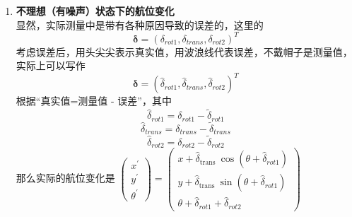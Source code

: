 \documentclass[../main.tex]{subfiles}
\begin{document}
\begin{enumerate}
\begin{enumerate}
        \item \textbf{不理想（有噪声）状态下的航位变化}\\
        显然，实际测量中是带有各种原因导致的误差的，这里的$$\boldsymbol{\delta} = (\delta_{rot1}, \delta_{trans}, \delta_{rot2})^T$$
        考虑误差后，用头尖尖表示真实值，用波浪线代表误差，不戴帽子是测量值，实际上可以写作
        $$\boldsymbol{\delta} = ({\widehat{\delta }}_{rot1},{\widehat{\delta }}_{trans}, {\widehat{\delta }}_{rot2})^T$$
        根据“真实值=测量值 - 误差”，其中
        $${\widehat{\delta }}_{rot1} = {\delta }_{rot1} - {\widetilde{\delta }}_{rot1}$$
        $${\widehat{\delta }}_{trans} = {\delta }_{trans} - {\widetilde{\delta }}_{trans}$$
        $${\widehat{\delta }}_{rot2} = {\delta }_{rot2} - {\widetilde{\delta }}_{rot2} $$
        那么实际的航位变化是
        \( \left( \begin{array}{l} {x}^{\prime } \\  {y}^{\prime } \\  {\theta }^{\prime } \end{array}\right)  = \left( \begin{matrix} x + {\widehat{\delta }}_{\text{trans }}\cos \left( {\theta  + {\widehat{\delta }}_{rot1}}\right) \\  y + {\widehat{\delta }}_{\text{trans }}\sin \left( {\theta  + {\widehat{\delta }}_{rot1}}\right) \\  \theta  + {\widehat{\delta }}_{rot1} + {\widehat{\delta }}_{rot2} \end{matrix}\right) \)


\end{enumerate}
\end{enumerate}
\end{document}
